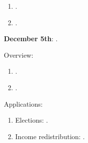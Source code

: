 \documentclass[letterpaper]{article}
\renewenvironment{itemize}{
  \begin{list}{}{
    \setlength{\leftmargin}{1.5em}
  }
}{
  \end{list}
}
\begin{document}
\begin{enumerate}
\begin{itemize}
\begin{enumerate}
              \item[$\bullet$] \href{https://doi.org/10.1093/pan/mpr048}{}.

              \item[$\bullet$] \href{https://link.springer.com/10.1057/s41269-020-00174-4}{}.

          \end{enumerate}

      \end{itemize}

  \item {\bf December 5th}:  {\color{ForestGreen}{\bf Natural Experiments}}.


      \begin{itemize} 

        \item[$\diamond$] Overview:

        \begin{enumerate}

          \item[$\bullet$] \href{https://www.cambridge.org/core/product/identifier/9781108777919%23c6/type/book_part}{\fullcite{Titiunik2021}}.

          \item[$\bullet$] \href{https://doi.org/10.1017/S0003055411000542}{}.

        \end{enumerate}

       \item[$\diamond$] Applications:

           \begin{enumerate}

           \item[$\bullet$] Elections: \href{https://doi.org/10.1111/pops.12940}{}.


           \item[$\bullet$] Income redistribution: \href{https://doi.org/10.1111/j.1467-9221.2006.00509.x}{}.


\end{enumerate}
\end{itemize}
\end{enumerate}
\end{document}
